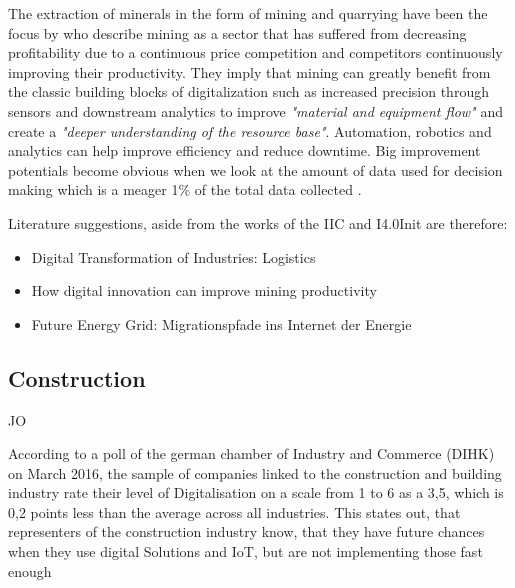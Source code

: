 The extraction of minerals in the form of mining and quarrying have been the focus by \citeauthor{mckinseymining:2015} who describe mining as a sector that has suffered from decreasing profitability due to a continuous price competition and competitors continuously improving their productivity. They imply that mining can greatly benefit from the classic building blocks of digitalization such as increased precision through sensors and downstream analytics to improve \emph{"material and equipment flow"} and create a \emph{"deeper understanding of the resource base"}. Automation, robotics and analytics can help improve efficiency and reduce downtime. Big improvement potentials become obvious when we look at the amount of data used for decision making which is a meager 1\% of the total data collected \cite[p.7]{mckinseymining:2015}.

Literature suggestions, aside from the works of the \ac{IIC} and \ac{I4.0Init} are therefore:

\begin{itemize}
\item Digital Transformation of Industries: Logistics \cite{worldforumlogistics:2016}
\item How digital innovation can improve mining productivity \cite{mckinseymining:2015}
\item Future Energy Grid: Migrationspfade ins Internet der Energie \cite{AppelrathKagermannMayer2012}
\end{itemize}


\subsection{Construction}
JO


According to a poll of the german chamber of Industry and Commerce (\ac{DIHK}) on March 2016, the sample of companies linked to the construction and building industry rate their level of Digitalisation on a scale from 1 to 6 as a 3,5, which is 0,2 points less than the average across all industries. This states out, that representers of the construction industry know, that they have future chances when they use digital Solutions and \ac{IoT}, but are not implementing those fast enough %

